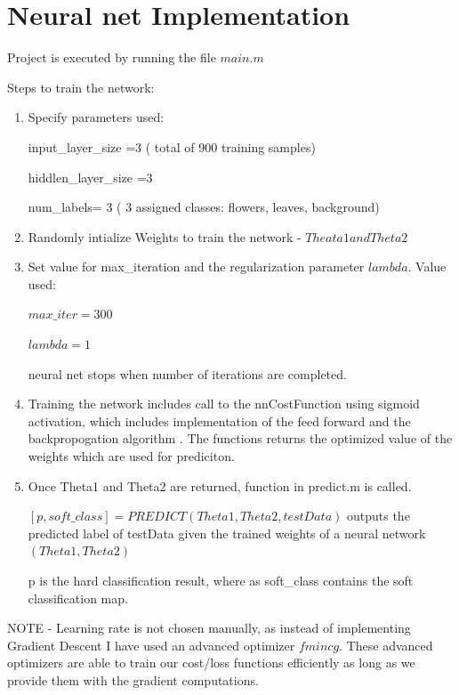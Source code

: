 \documentclass[a4paper, 12pt]{article}
\begin{document}
\newpage
\section{ Neural net Implementation }

Project is executed by running the file $main.m$

Steps  to train the network:

\begin{enumerate}
 
  \item Specify parameters used:

input\_layer\_size =3    ( total of 900 training samples)

hiddlen\_layer\_size =3

num\_labels= 3   ( 3 assigned classes: flowers, leaves, background)

  \item Randomly intialize Weights to train the network - $ Theata1 and Theta2$
  \item Set value for max\_iteration and the regularization parameter $lambda$.
		Value used: 
			
				$max\_iter=300$
	
				$lambda=1$

neural net stops when number of iterations are completed.
 \item Training the network includes call to the nnCostFunction using sigmoid activation, which includes implementation of the feed forward and the backpropogation algorithm . The functions returns the optimized value of the weights which are used for prediciton.

\item Once Theta1 and Theta2 are returned,   function in predict.m is called.

$[p, soft\_class] = PREDICT(Theta1, Theta2, testData)$ outputs the predicted label of testData given the
   trained weights of a neural network $(Theta1, Theta2)$

p is the hard classification result, where as soft\_class contains the soft classification map.
 \end{enumerate}

NOTE - Learning rate is not chosen manually, as instead of implementing Gradient Descent I have used an advanced optimizer $fmincg$. These
 advanced optimizers are able to train our cost/loss functions efficiently as long as we provide them with the gradient computations.
\end{document}
